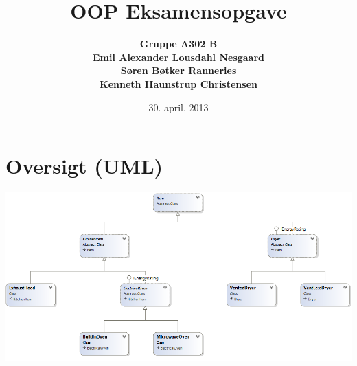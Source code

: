 \documentclass[11pt]{article}
\begin{document}
\title{OOP Eksamensopgave}
\author{\bf{Gruppe A302 B}\\Emil Alexander Lousdahl Nesgaard\\Søren Bøtker Ranneries\\Kenneth Haunstrup Christensen}
\date{30. april, 2013}
\maketitle

\section{Oversigt (UML)}
\includegraphics[width=\textwidth]{klassediagram}
\end{document}
